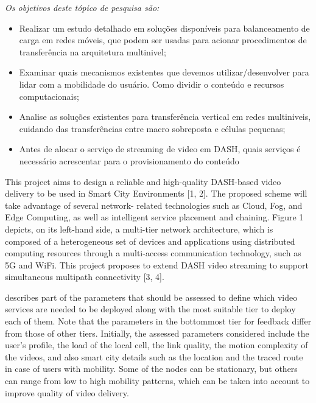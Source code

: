 \emph{Os objetivos deste tópico de pesquisa são:}
\begin{itemize}

\item Realizar um estudo detalhado em soluções disponíveis para balanceamento de carga em redes móveis, que podem ser usadas para acionar procedimentos de transferência na arquitetura multinivel;

\item Examinar quais mecanismos existentes que devemos utilizar/desenvolver para lidar com a mobilidade do usuário.
Como dividir o conteúdo e recursos computacionais;

\item Analise as soluções existentes para transferência vertical em redes multiniveis, cuidando das transferências entre macro sobreposta e células pequenas;

\item Antes de alocar o serviço de streaming de video em DASH, quais serviços é necessário
acrescentar para o provisionamento do conteúdo

\end{itemize}

This project aims to design a reliable and high-quality DASH-based video delivery to be used in
Smart City Environments [1, 2]. The proposed scheme will take advantage of several network-
related technologies such as Cloud, Fog, and Edge Computing, as well as intelligent service
placement and chaining. Figure 1 depicts, on its left-hand side, a multi-tier network architecture,
which is composed of a heterogeneous set of devices and applications using distributed computing
resources through a multi-access communication technology, such as 5G and WiFi. This project
proposes to extend DASH video streaming to support simultaneous multipath connectivity [3, 4].


describes part of the parameters that should be assessed to define which video services are needed to be deployed along with the most suitable tier to deploy each of them. Note that the parameters in the bottommost tier for feedback differ from those of other tiers.
Initially, the assessed parameters considered include the user’s profile, the load of the local cell, the link quality, the motion complexity of the videos, and also smart city details such as the location and the traced route in case of users with mobility. Some of the nodes can be stationary, but others can range from low to high mobility patterns, which can be taken into account to improve quality of video delivery.

